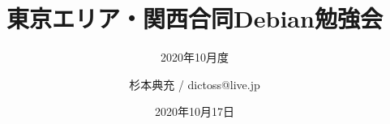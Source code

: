 \title{東京エリア・関西合同Debian勉強会}
\subtitle{2020年10月度} %
\author{杉本典充 / dictoss@live.jp}
\date{2020年10月17日}



\begin{frame}
\titlepage{}
\end{frame}


